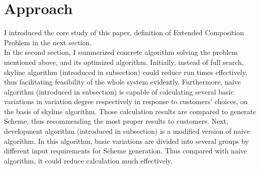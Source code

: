 \documentclass[senior,final,11pt]{iscs-thesis}
\begin{document}
\chapter{Approach}%


I introduced the core study of this paper, definition of Extended Composition Problem in the next section. \\
In the second section, I summerized concrete algorithm solving the problem mentioned above, and its optimized algorithm. Initially, instead of full search, skyline algorithm (introduced in subsection) could reduce run times effectively, thus facilitating feasibility of the whole system evidently. Furthermore, naive algorithm (introduced in subsection) is capable of calculating several basic variations in variation degree respectively in response to customers' choices, on the basis of skyline algorithm. Those calculation results are compared to generate Scheme, thus recommending the most proper results to customers. Next, development algorithm (introduced in subsection) is a modified version of naive algorithm. In this algorithm, basic variations are divided into several groups by different input requirements for Scheme generation. Thus compared with naive algorithm, it could reduce calculation much effectively. 
\end{document}

